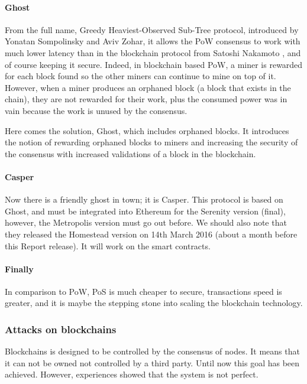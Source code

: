 \paragraph{Ghost}
From the full name, Greedy Heaviest-Observed Sub-Tree protocol, introduced by Yonatan Sompolinsky and Aviv Zohar\cite{Sompolinsky2014AcceleratingChains}, it allows the PoW consensus to work with much lower latency than in the blockchain protocol from Satoshi Nakamoto \cite{SatoshiNakamoto2008Bitcoin:System}, and of course keeping it secure. Indeed, in blockchain based PoW, a miner is rewarded for each block found so the other miners can continue to mine on top of it. However, when a miner produces an orphaned block (a block that exists in the chain), they are not rewarded for their work, plus the consumed power was in vain because the work is unused by the consensus.

Here comes the solution, Ghost, which includes orphaned blocks. It introduces the notion of rewarding orphaned blocks to miners and increasing the security of the consensus with increased validations of a block in the blockchain.

\paragraph{Casper}
Now there is a friendly ghost in town; it is Casper\cite{Buterin2015UnderstandingCasper}. This protocol is based on Ghost, and must be integrated into Ethereum for the Serenity\cite{Buterin2014SlasherStake} version (final), however, the Metropolis version must go out before. We should also note that they released the Homestead version on 14th March 2016 (about a month before this Report release). It will work on the smart contracts.

\paragraph{Finally}
In comparison to PoW, PoS is much cheaper to secure, transactions speed is greater, and it is maybe the stepping stone into scaling the blockchain technology.

\subsubsection{Attacks on blockchains}
Blockchains is designed to be controlled by the consensus of nodes. It means that it can not be owned not controlled by a third party. Until now this goal has been achieved. However, experiences showed that the system is not perfect.

